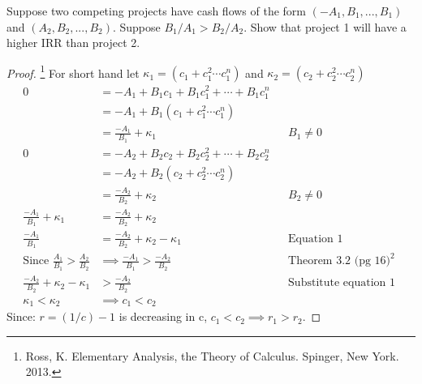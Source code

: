 \documentclass[12pt]{article}
\newenvironment{problem}[2][Problem]{\begin{trivlist}
\item[\hskip \labelsep {\bfseries #1}\hskip \labelsep {\bfseries #2.}]}{\end{trivlist}}
\begin{document}
\begin{problem}{2.14} Suppose two competing projects have cash flows of the form $(-A_1,B_1,...,B_1)$ and $(A_2, B_2,...,B_2)$. Suppose $B_1/A_1 > B_2/A_2 $. Show that project 1 will have a higher IRR than project 2.
\begin{proof}\footnote{Ross, K. Elementary Analysis, the Theory of Calculus. Spinger, New York. 2013.} For short hand let $\kappa_1 = (c_1 +c_1^2 \cdots c_1^n)$ and $\kappa_2 = (c_2 +c_2^2 \cdots c_2^n)$
\begin{align*}
0&= -A_1 + B_1c_1 +B_1c_1^2 + \cdots + B_1c_1^n \\
&= -A_1 + B_1(c_1 +c_1^2 \cdots c_1^n) \\
&= \frac{-A_1}{B_1} + \kappa_1 && B_1 \neq 0  \\ 
0&= -A_2 + B_2c_2 +B_2c_2^2 + \cdots + B_2c_2^n \\
&= -A_2 + B_2(c_2 +c_2^2 \cdots c_2^n) \\
&= \frac{-A_2}{B_2} + \kappa_2 && B_2 \neq 0  \\ 
\frac{-A_1}{B_1} + \kappa_1 &= \frac{-A_2}{B_2} + \kappa_2 \\ 
\frac{-A_1}{B_1} &= \frac{-A_2}{B_2} + \kappa_2 -\kappa_1 &&\text{Equation 1}\\ 
\text{Since  } \frac{A_1}{B_1} > \frac{A_2}{B_2} & \implies   \frac{-A_1}{B_1} > \frac{-A_2}{B_2} &&\text{Theorem 3.2 (pg 16)}^2 \\ 
 \frac{-A_2}{B_2} + \kappa_2 -\kappa_1 &>  \frac{-A_2}{B_2} && \text{Substitute equation 1 }\\
\kappa_1 < \kappa_2 &\implies c_1 < c_2
\end{align*} 
Since: $r=(1/c)-1$ is decreasing in c,  $c_1<c_2 \implies r_1 >r_2$. 
\end{proof}

\end{problem}
\end{document}
